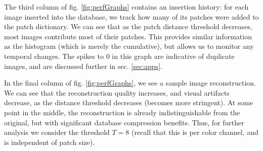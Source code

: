 The third column of fig. \ref{fig:perfGraphs} contains an insertion history: for each image inserted into the database, we track how many of its patches were added to the patch dictionary. We can see that as the patch distance threshold decreases, most images contribute most of their patches. This provides similar information as the histogram (which is merely the cumulative), but allows us to monitor any temporal changes. The spikes to 0 in this graph are indicative of duplicate images, and are discussed further in sec. \ref{sec:apps}.

In the final column of fig. \ref{fig:perfGraphs}, we see a sample image reconstruction. We can see that the reconstruction quality increases, and visual artifacts decrease, as the distance threshold decreases (becomes more stringent). At some point in the middle, the reconstruction is already indistinguishable from the original, but with significant database compression benefits. Thus, for further analysis we consider the threshold $T=8$ (recall that this is per color channel, and is independent of patch size).


